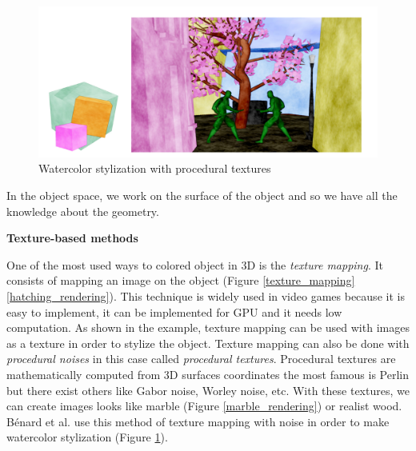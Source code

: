\begin{figure}
    \begin{center}
    \includegraphics[scale=0.3]{pics/watercolor_objspace.png}
    \end{center}
    \caption{Watercolor stylization with procedural textures \cite{benard_dynamic_2009}}
    \label{watercolor_rendering}
\end{figure}





In the object space, we work on the surface of the object and so we have all the knowledge about the geometry. \newline


\textbf{Texture-based methods}


One of the most used ways to colored object in 3D is the \textit{texture mapping}. It consists of mapping an image on the object (Figure \ref{texture_mapping}\ref{hatching_rendering}). This technique is widely used in video games because it is easy to implement, it can be implemented for GPU and it needs low computation. As shown in the example, texture mapping can be used with images as a texture in order to stylize the object\cite{praun_real-time_2001, klein_non-photorealistic_2000, freudenberg_walk-through_2001}. Texture mapping can also be done with \textit{procedural noises}\cite{perlin_improving_2002} in this case called \textit{procedural textures}. Procedural textures are mathematically computed from 3D surfaces coordinates the most famous is Perlin but there exist others like Gabor noise, Worley noise, etc. With these textures, we can create images looks like marble (Figure \ref{marble_rendering}) or realist wood. Bénard et al.\cite{benard_dynamic_2009, benard_dynamic_2010} use this method of texture mapping with noise in order to make watercolor stylization (Figure \ref{watercolor_rendering}). \newline


